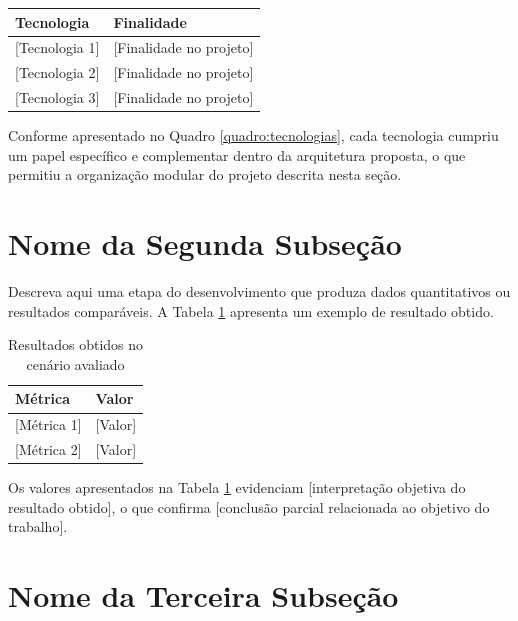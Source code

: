 \documentclass[
    12pt,
    openright,
    oneside,
    a4paper,
    brazil
]{abntex2}
\begin{document}
\begin{quadro}[H]
    \centering
    \caption{Tecnologias utilizadas e suas finalidades}
    \label{quadro:tecnologias}
    \begin{tabular}{ll}
        \toprule
        \textbf{Tecnologia} & \textbf{Finalidade} \\
        \midrule
        {[}Tecnologia 1{]} & {[}Finalidade no projeto{]} \\
        {[}Tecnologia 2{]} & {[}Finalidade no projeto{]} \\
        {[}Tecnologia 3{]} & {[}Finalidade no projeto{]} \\
        \bottomrule
    \end{tabular}
\end{quadro}

Conforme apresentado no Quadro \ref{quadro:tecnologias}, cada tecnologia cumpriu um papel específico e complementar dentro da arquitetura proposta, o que permitiu a organização modular do projeto descrita nesta seção.

\section{Nome da Segunda Subseção}

Descreva aqui uma etapa do desenvolvimento que produza dados quantitativos ou resultados comparáveis. A Tabela \ref{tab:resultados} apresenta um exemplo de resultado obtido.

\begin{table}[H]
    \centering
    \caption{Resultados obtidos no cenário avaliado}
    \label{tab:resultados}
    \begin{tabular}{ll}
        \toprule
        \textbf{Métrica} & \textbf{Valor} \\
        \midrule
        {[}Métrica 1{]} & {[}Valor{]} \\
        {[}Métrica 2{]} & {[}Valor{]} \\
        \bottomrule
    \end{tabular}
\end{table}

Os valores apresentados na Tabela \ref{tab:resultados} evidenciam [interpretação objetiva do resultado obtido], o que confirma [conclusão parcial relacionada ao objetivo do trabalho].

\section{Nome da Terceira Subseção}
\end{document}
